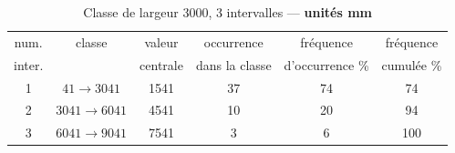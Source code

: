 \begin{enumerate}
\begin{table}[htdp]
\caption{Classe de largeur 3000, 3 intervalles --- \textbf{unités mm}}
\begin{center}
\begin{tabular}{cccccc}
\hline
num. & classe & valeur & occurrence & fréquence & fréquence\\
inter. &  & centrale & dans la classe & d'occurrence \% & cumulée \%\\\hline
 1 & $  41 \rightarrow 3041$ & 1541 & 37 & 74 &  74\\
 2 & $3041 \rightarrow 6041$ & 4541 & 10 & 20 &  94\\
 3 & $6041 \rightarrow 9041$ & 7541 & 3 &  6 & 100\\
\hline
\end{tabular}
\end{center}
\label{tab:03}
\end{table}


\end{enumerate}
